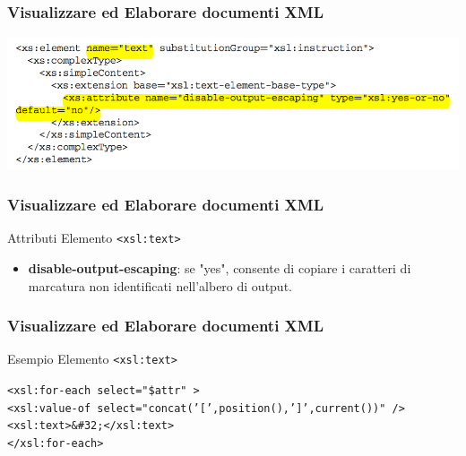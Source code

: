 \begin{frame}
    \frametitle{Visualizzare ed Elaborare documenti XML}
    \addtocounter{nframe}{1}
    
    \begin{center}
        \includegraphics[width=.95\textwidth]{imgs/Schema-text.png}
    \end{center}

\end{frame}

\begin{frame}
    \frametitle{Visualizzare ed Elaborare documenti XML}
    \addtocounter{nframe}{1}
    

     \begin{block}{Attributi Elemento \texttt{<xsl:text>}}
         \begin{itemize}
             \item \textbf{disable-output-escaping}: se "yes", consente di copiare i caratteri di marcatura non identificati nell'albero di output.
        \end{itemize}
     \end{block}
    
\end{frame}

\begin{frame}
    \frametitle{Visualizzare ed Elaborare documenti XML}
    \addtocounter{nframe}{1}
    

     \begin{block}{Esempio Elemento \texttt{<xsl:text>}}
        
        \texttt{<xsl:for-each select="\$attr" >}
        \\\texttt{<xsl:value-of select="concat('[',position(),']',current())" />}
        \\\texttt{<xsl:text>\&\#32;</xsl:text>}
        \\\texttt{</xsl:for-each>}

     \end{block}

\end{frame}

